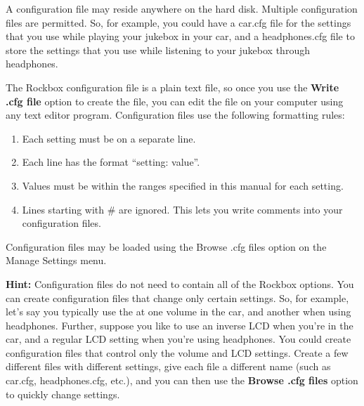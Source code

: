 \begin{itemize}
\begin{itemize}
      A configuration file may reside anywhere on the hard disk. Multiple configuration files are permitted. So, for example, you could have a car.cfg file for the settings that you use while playing your jukebox in your car, and a headphones.cfg file to store the settings that you use while listening to your jukebox through headphones.

      The Rockbox configuration file is a plain text file, so once you use the \textbf{Write .cfg file} option to create the file, you can edit the file on your computer using any text editor program. Configuration files use the following formatting rules:

      \begin{enumerate}
      \item Each setting must be on a separate line.
      \item Each line has the format ``setting: value''.
      \item Values must be within the ranges specified in this manual for each setting.
      \item Lines starting with \# are ignored. This lets you write comments into your configuration files.
      \end{enumerate}

      Configuration files may be loaded using the Browse .cfg files option on the Manage Settings menu.

      \textbf{Hint:  }Configuration files do not need to contain all of the Rockbox options.  You can create configuration files that change only certain settings. So, for example, let's say you typically use the \dap at one volume in the car, and another when using headphones.  Further, suppose you like to use an inverse LCD when you're in the car, and a regular LCD setting when you're using headphones.  You could create configuration files that control only the volume and LCD settings. Create a few different files with different settings, give each file a different name (such as car.cfg, headphones.cfg, etc.), and you can then use the \textbf{Browse .cfg files} option to quickly change settings.
    \end{itemize}

  \end{itemize}
